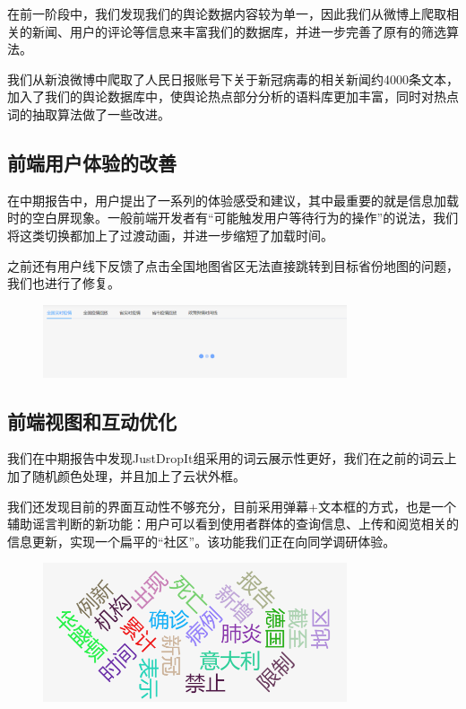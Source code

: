 \documentclass{article}
\begin{document}
在前一阶段中，我们发现我们的舆论数据内容较为单一，因此我们从微博上爬取相关的新闻、用户的评论等信息来丰富我们的数据库，并进一步完善了原有的筛选算法。

我们从新浪微博中爬取了人民日报账号下关于新冠病毒的相关新闻约4000条文本，加入了我们的舆论数据库中，使舆论热点部分分析的语料库更加丰富，同时对热点词的抽取算法做了一些改进。


\subsection{前端用户体验的改善}

在中期报告中，用户提出了一系列的体验感受和建议，其中最重要的就是信息加载时的空白屏现象。一般前端开发者有“可能触发用户等待行为的操作”的说法，我们将这类切换都加上了过渡动画，并进一步缩短了加载时间。

之前还有用户线下反馈了点击全国地图省区无法直接跳转到目标省份地图的问题，我们也进行了修复。



\begin{figure}[H]
\centering
\includegraphics[width=0.8\textwidth]{pic5.png}
\end{figure}

\subsection{前端视图和互动优化}

我们在中期报告中发现JustDropIt组采用的词云展示性更好，我们在之前的词云上加了随机颜色处理，并且加上了云状外框。

我们还发现目前的界面互动性不够充分，目前采用弹幕+文本框的方式，也是一个辅助谣言判断的新功能：用户可以看到使用者群体的查询信息、上传和阅览相关的信息更新，实现一个扁平的“社区”。该功能我们正在向同学调研体验。

\begin{figure}[H]
\centering
\includegraphics[width=0.8\textwidth]{pic6.png}
\end{figure}
\end{document}
